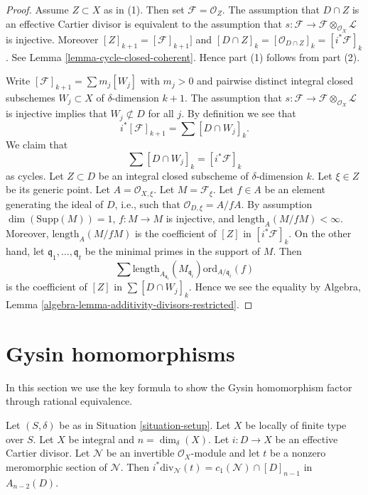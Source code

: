 \begin{proof}
Assume $Z \subset X$ as in (1). Then set $\mathcal{F} = \mathcal{O}_Z$.
The assumption that $D \cap Z$ is an effective Cartier divisor is
equivalent to the assumption that
$s : \mathcal{F} \to \mathcal{F} \otimes_{\mathcal{O}_X} \mathcal{L}$
is injective. Moreover $[Z]_{k + 1} = [\mathcal{F}]_{k + 1}]$
and $[D \cap Z]_k = [\mathcal{O}_{D \cap Z}]_k = [i^*\mathcal{F}]_k$.
See Lemma \ref{lemma-cycle-closed-coherent}.
Hence part (1) follows from part (2).

\medskip\noindent
Write $[\mathcal{F}]_{k + 1} = \sum m_j[W_j]$ with $m_j > 0$
and pairwise distinct integral closed subschemes $W_j \subset X$
of $\delta$-dimension $k + 1$. The assumption that
$s : \mathcal{F} \to \mathcal{F} \otimes_{\mathcal{O}_X} \mathcal{L}$
is injective implies that $W_j \not \subset D$ for all $j$.
By definition we see that
$$
i^*[\mathcal{F}]_{k + 1} = \sum [D \cap W_j]_k.
$$
We claim that
$$
\sum [D \cap W_j]_k = [i^*\mathcal{F}]_k
$$
as cycles.
Let $Z \subset D$ be an integral closed subscheme of $\delta$-dimension
$k$. Let $\xi \in Z$ be its generic point. Let $A = \mathcal{O}_{X, \xi}$.
Let $M = \mathcal{F}_\xi$. Let $f \in A$ be an element generating the
ideal of $D$, i.e., such that $\mathcal{O}_{D, \xi} = A/fA$.
By assumption $\dim(\text{Supp}(M)) = 1$, $f : M \to M$ is injective, and
$\text{length}_A(M/fM) < \infty$. Moreover, $\text{length}_A(M/fM)$
is the coefficient of $[Z]$ in $[i^*\mathcal{F}]_k$. On the
other hand, let $\mathfrak q_1, \ldots, \mathfrak q_t$ be the minimal
primes in the support of $M$. Then
$$
\sum
\text{length}_{A_{\mathfrak q_i}}(M_{\mathfrak q_i})
\text{ord}_{A/\mathfrak q_i}(f)
$$
is the coefficient of $[Z]$ in $\sum [D \cap W_j]_k$.
Hence we see the equality by
Algebra, Lemma \ref{algebra-lemma-additivity-divisors-restricted}.
\end{proof}








\section{Gysin homomorphisms}
\label{section-gysin}

\noindent
In this section we use the key formula to show the Gysin homomorphism
factor through rational equivalence.

\begin{lemma}
\label{lemma-gysin-factors-general}
Let $(S, \delta)$ be as in Situation \ref{situation-setup}.
Let $X$ be locally of finite type over $S$.
Let $X$ be integral and $n = \dim_\delta(X)$.
Let $i : D \to X$ be an effective Cartier divisor.
Let $\mathcal{N}$ be an invertible $\mathcal{O}_X$-module
and let $t$ be a nonzero meromorphic section of $\mathcal{N}$.
Then $i^*\text{div}_\mathcal{N}(t) = c_1(\mathcal{N}) \cap [D]_{n - 1}$
in $A_{n - 2}(D)$.
\end{lemma}

